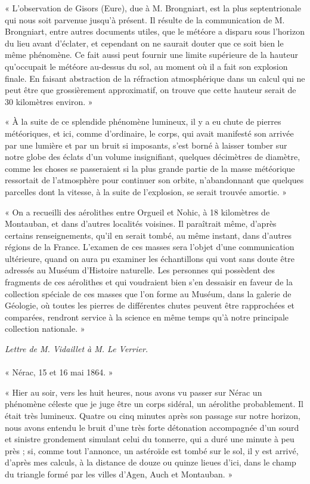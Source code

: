 \documentclass[a4paper, 11pt, oneside, polutonikogreek, french]{article}
\begin{document}
« L'observation de Gisors (Eure), due à M. Brongniart, est la plus septentrionale qui nous soit parvenue jusqu'à présent. Il résulte de la communication de M. Brongniart, entre autres documents utiles, que le météore a disparu sous l'horizon du lieu avant d'éclater, et cependant on ne saurait douter que ce soit bien le même phénomène. Ce fait aussi peut fournir une limite supérieure de la hauteur qu'occupait le météore au-dessus du sol, au moment où il a fait son explosion finale. En faisant abstraction de la réfraction atmosphérique dans un calcul qui ne peut être que grossièrement approximatif, on trouve que cette hauteur serait de 30 kilomètres environ. »

« À la suite de ce splendide phénomène lumineux, il y a eu chute de pierres météoriques, et ici, comme d'ordinaire, le corps, qui avait manifesté son arrivée par une lumière et par un bruit si imposants, s'est borné à laisser tomber sur notre globe des éclats d'un volume insignifiant, quelques décimètres de diamètre, comme les choses se passeraient si la plus grande partie de la masse météorique ressortait de l'atmosphère pour continuer son orbite, n'abandonnant que quelques parcelles dont la vitesse, à la suite de l'explosion, se serait trouvée amortie. »

« On a recueilli des aérolithes entre Orgueil et Nohic, à 18 kilomètres de Montauban, et dans d'autres localités voisines. Il paraîtrait même, d'après certains renseignements, qu'il en serait tombé, au même instant, dans d'autres régions de la France. L'examen de ces masses sera l'objet d'une communication ultérieure, quand on aura pu examiner les échantillons qui vont sans doute être adressés au Muséum d'Histoire naturelle. Les personnes qui possèdent des fragments de ces aérolithes et qui voudraient bien s'en dessaisir en faveur de la collection spéciale de ces masses que l'on forme au Muséum, dans la galerie de Géologie, où toutes les pierres de différentes chutes peuvent être rapprochées et comparées, rendront service à la science en même temps qu'à notre principale collection nationale. »
\begin{center}
\emph{Lettre de M. Vidaillet à M. Le Verrier.}
\end{center}
\paragraph{}
« Nérac, 15 et 16 mai 1864. »

« Hier au soir, vers les huit heures, nous avons vu passer sur Nérac un phénomène céleste que je juge être un corps sidéral, un aérolithe probablement. Il était très lumineux. Quatre ou cinq minutes après son passage sur notre horizon, nous avons entendu le bruit d'une très forte détonation accompagnée d'un sourd et sinistre grondement simulant celui du tonnerre, qui a duré une minute à peu près ; si, comme tout l'annonce, un astéroïde est tombé sur le sol, il y est arrivé, d'après mes calculs, à la distance de douze ou quinze lieues d'ici, dans le champ du triangle formé par les villes d'Agen, Auch et Montauban. »
\end{document}

